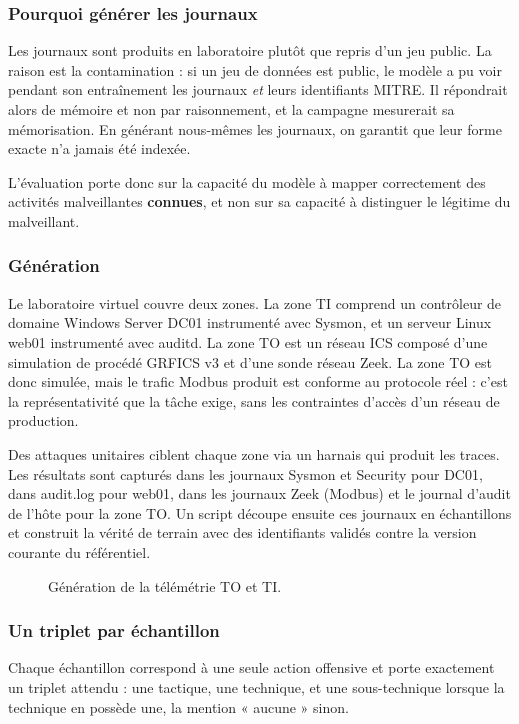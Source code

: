 \subsubsection{Pourquoi générer les journaux}\label{sec:1-1-2}
Les journaux sont produits en laboratoire plutôt que repris d'un jeu public. La raison est la contamination : si un jeu de données est public, le modèle a pu voir pendant son entraînement les journaux \emph{et} leurs identifiants MITRE. Il répondrait alors de mémoire et non par raisonnement, et la campagne mesurerait sa mémorisation. En générant nous-mêmes les journaux, on garantit que leur forme exacte n'a jamais été indexée.

L'évaluation porte donc sur la capacité du modèle à mapper correctement des activités malveillantes \textbf{connues}, et non sur sa capacité à distinguer le légitime du malveillant.

\subsubsection{Génération}\label{sec:1-2-2}
Le laboratoire virtuel couvre deux zones. La zone TI comprend un contrôleur de domaine Windows Server DC01 instrumenté avec Sysmon, et un serveur Linux web01 instrumenté avec auditd. La zone TO est un réseau ICS composé d'une simulation de procédé GRFICS v3 et d'une sonde réseau Zeek. La zone TO est donc simulée, mais le trafic Modbus produit est conforme au protocole réel : c'est la représentativité que la tâche exige, sans les contraintes d'accès d'un réseau de production.

Des attaques unitaires ciblent chaque zone via un harnais qui produit les traces. Les résultats sont capturés dans les journaux Sysmon et Security pour DC01, dans audit.log pour web01, dans les journaux Zeek (Modbus) et le journal d'audit de l'hôte pour la zone TO. Un script découpe ensuite ces journaux en échantillons et construit la vérité de terrain avec des identifiants validés contre la version courante du référentiel.

\begin{figure}[htbp]
\centering
{}
\caption{Génération de la télémétrie TO et TI.}\label{fig:telemetrie}
\end{figure}

\subsubsection{Un triplet par échantillon}\label{sec:1-3}
Chaque échantillon correspond à une seule action offensive et porte exactement un triplet attendu : une tactique, une technique, et une sous-technique lorsque la technique en possède une, la mention « aucune » sinon.


